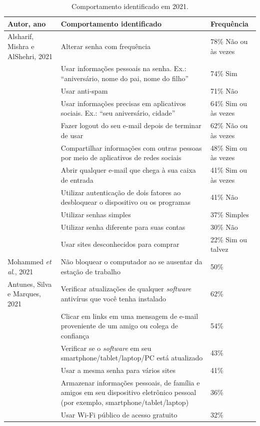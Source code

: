 \documentclass[portuguese]{textolivre}
\begin{document}
\begin{footnotesize}
\begin{longtable}{p{2cm} p{5cm} p{3cm}}
\caption{Comportamento identificado em 2021.}
\label{tab03-appendix}
\\
\toprule
Autor, ano & Comportamento identificado & Frequência \\
\midrule
Alsharif, Mishra e AlShehri, 2021 & Alterar	senha com frequência & 78\% Não ou às vezes \\
& Usar informações pessoais na senha. Ex.: ``aniversário, nome do pai, nome do filho'' & 74\% Sim \\
& Usar anti-spam & 71\% Não \\
& Usar informações precisas em aplicativos sociais. Ex.: ``seu aniversário, cidade'' & 64\% Sim ou às vezes \\
& Fazer logout do seu e-mail depois de terminar de usar & 62\% Não ou às vezes \\
& Compartilhar informações com outras pessoas por meio de aplicativos de redes sociais & 48\% Sim ou às vezes \\
& Abrir qualquer e-mail que chega à sua caixa de entrada & 41\% Sim ou às vezes \\
& Utilizar autenticação de dois fatores ao desbloquear o dispositivo ou os programas & 41\% Não \\
& Utilizar senhas simples & 37\% Simples \\
& Utilizar senha diferente para suas contas & 30\% Não \\
& Usar sites desconhecidos para comprar & 22\% Sim ou talvez \\
\midrule
Mohammed \emph{et al}., 2021 & Não bloquear o computador ao se ausentar da estação de trabalho & 50\% \\
\midrule
Antunes, Silva e Marques, 2021 & Verificar	atualizações de qualquer \emph{software} antivírus que você tenha instalado & 62\% \\
& Clicar em links em uma mensagem de e-mail proveniente de um amigo ou colega de confiança & 54\% \\
& Verificar se o \emph{software} em seu smartphone/tablet/laptop/PC está atualizado & 43\% \\
& Usar a mesma senha para vários sites & 41\% \\
& Armazenar informações pessoais, de família e amigos em seu dispositivo	eletrônico pessoal (por exemplo, smartphone/tablet/laptop) & 36\% \\
& Usar Wi-Fi público de acesso gratuito & 32\% \\

\end{longtable}
\end{footnotesize}
\end{document}
